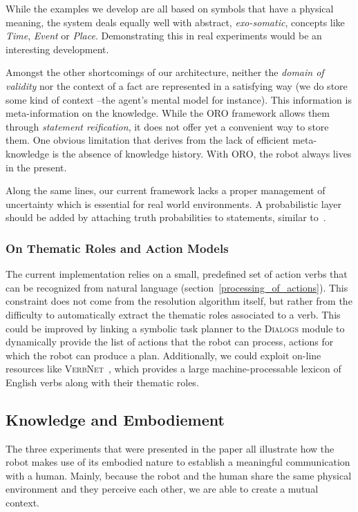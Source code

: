 While the examples we develop are all based on symbols that have a physical
meaning, the system deals equally well with abstract, \emph{exo-somatic},
concepts like \emph{Time}, \emph{Event} or \emph{Place}. Demonstrating this in
real experiments would be an interesting development.

Amongst the other shortcomings of our architecture, neither the \emph{domain of
validity} nor the context of a fact are represented in a satisfying way (we do
store some kind of context --the agent's mental model for instance). This
information is meta-information on the knowledge. While the ORO framework
allows them through \emph{statement reification}, it does not offer yet a
convenient way to store them. One obvious limitation that derives from the lack
of efficient meta-knowledge is the absence of knowledge history.  With ORO, the
robot always lives in the present.

Along the same lines, our current framework lacks a proper management of
uncertainty which is essential for real world environments. A probabilistic
layer should be added by attaching truth probabilities to statements, similar
to~\cite{Jain2009}.

\subsubsection{On Thematic Roles and Action Models}

The current implementation relies on a small, predefined set of action verbs that can
be recognized from natural language (section~\ref{processing_of_actions}).
This constraint does not come from the resolution algorithm itself, but
rather from the difficulty to automatically extract the thematic roles associated
to a verb. 
This could be improved by linking a symbolic task
planner to the \textsc{Dialogs} module to dynamically provide the list of
actions that the robot can process, \ie actions for which the robot can produce
a plan. Additionally, we could exploit on-line resources like
\textsc{VerbNet}~\cite{Kipper2008}, which provides a large machine-processable
lexicon of English verbs along with their thematic roles.

\subsection{Knowledge and Embodiement}

The three experiments that were presented in the paper all illustrate how the
robot makes use of its embodied nature to establish a meaningful communication
with a human. Mainly, because the robot and the human share the same physical
environment and they perceive each other, we are able to create a mutual
context.

